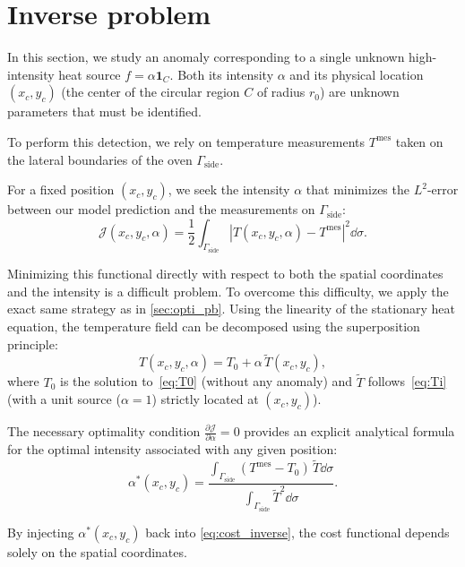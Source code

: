\section{Inverse problem}

In this section, we study an anomaly corresponding to a single unknown high-intensity heat source $f = \alpha \mathbf{1}_{C}$. Both its intensity $\alpha$ and its physical location $(x_c, y_c)$ (the center of the circular region $C$ of radius $r_0$) are unknown parameters that must be identified. 

To perform this detection, we rely on temperature measurements $T^{\text{mes}}$ taken on the lateral boundaries of the oven $\Gamma_{\text{side}}$. 

For a fixed position $(x_c, y_c)$, we seek the intensity $\alpha$ that minimizes the $L^2$-error between our model prediction and the measurements on $\Gamma_{\text{side}}$:
\begin{equation} \label{eq:cost_inverse}
\mathcal{J}(x_c, y_c, \alpha) = \frac{1}{2}\int_{\Gamma_{\text{side}}} \left|T(x_c,y_c,\alpha) - T^{\text{mes}}\right|^2\dd\sigma.
\end{equation}

Minimizing this functional directly with respect to both the spatial coordinates and the intensity is a difficult problem. To overcome this difficulty, we apply the exact same strategy as in \cref{sec:opti_pb}. Using the linearity of the stationary heat equation, the temperature field can be decomposed using the superposition principle:
\begin{equation}
    T(x_c, y_c, \alpha) = T_0 + \alpha\,\tilde{T}(x_c, y_c),
\end{equation}
where $T_0$ is the solution to~\cref{eq:T0} (without any anomaly) and $\tilde{T}$ follows~\cref{eq:Ti} (with a unit source ($\alpha=1$) strictly located at $(x_c, y_c)$).

The necessary optimality condition $\frac{\partial \mathcal{J}}{\partial \alpha} = 0$ provides an explicit analytical formula for the optimal intensity associated with any given position:
\begin{equation} \label{eq:alpha_opt_inverse}
\alpha^*(x_c,y_c) = \frac{\displaystyle\int_{\Gamma_{\text{side}}} (T^{\text{mes}}-T_0)\,\tilde{T}\dd\sigma}{\displaystyle\int_{\Gamma_{\text{side}}} \tilde{T}^2\dd\sigma}.
\end{equation}

By injecting $\alpha^*(x_c,y_c)$ back into \cref{eq:cost_inverse}, the cost functional depends solely on the spatial coordinates.

